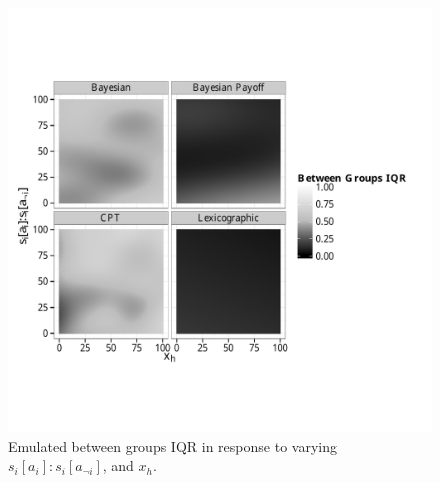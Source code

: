 \begin{figure}[h!]
\begin{adjustbox}{center}\includegraphics[width=0.8\paperwidth]{figures/unfixed_emu_payoff_honesty_group_iqr}\end{adjustbox}
\caption{Emulated between groups IQR in response to varying \(s_{i}[a_{i}]:s_{i}[a_{\neg i}]\), and \(x_{h}\).}
\label{fig:emulated_payoff_group_iqr}
\end{figure}
